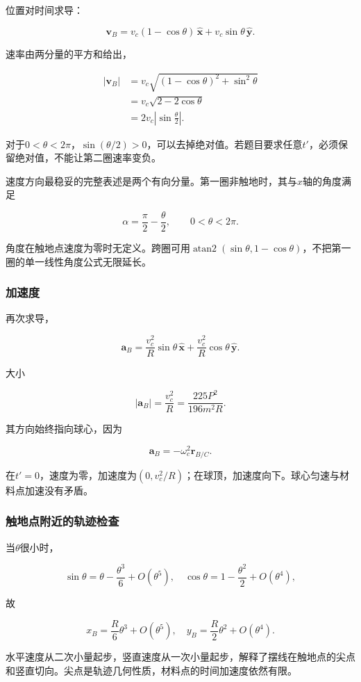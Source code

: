 \documentclass[12pt,a4paper,fontset=fandol]{ctexart}
\begin{document}
位置对时间求导：

\[
\boxed{
\mathbf v_B=
v_c(1-\cos\theta)\,\hat{\mathbf x}
+v_c\sin\theta\,\hat{\mathbf y}}.
\]

速率由两分量的平方和给出，

\[
\begin{aligned}
|\mathbf v_B|
&=v_c\sqrt{(1-\cos\theta)^2+\sin^2\theta}\\
&=v_c\sqrt{2-2\cos\theta}\\
&=\boxed{2v_c\left|\sin\frac{\theta}{2}\right|}.
\end{aligned}
\]

对于\(0<\theta<2\pi\)，\(\sin(\theta/2)>0\)，可以去掉绝对值。若题目要求任意\(t'\)，必须保留绝对值，不能让第二圈速率变负。

速度方向最稳妥的完整表述是两个有向分量。第一圈非触地时，其与\(x\)轴的角度满足

\[
\alpha=\frac{\pi}{2}-\frac{\theta}{2},
\qquad 0<\theta<2\pi.
\]

角度在触地点速度为零时无定义。跨圈可用\(\operatorname{atan2}(\sin\theta,1-\cos\theta)\)，不把第一圈的单一线性角度公式无限延长。

\par\noindent\begin{minipage}{\linewidth}
\subsubsection{加速度}\label{ux52a0ux901fux5ea6}

再次求导，

\[
\boxed{
\mathbf a_B=
\frac{v_c^2}{R}\sin\theta\,\hat{\mathbf x}
+\frac{v_c^2}{R}\cos\theta\,\hat{\mathbf y}}.
\]

大小

\[
\boxed{
|\mathbf a_B|=\frac{v_c^2}{R}
=\frac{225P^2}{196m^2R}}.
\]

其方向始终指向球心，因为

\[
\mathbf a_B=-\omega_c^2\mathbf r_{B/C}.
\]

在\(t'=0\)，速度为零，加速度为\((0,v_c^2/R)\)；在球顶，加速度向下。球心匀速与材料点加速没有矛盾。

\subsubsection{触地点附近的轨迹检查}\label{ux89e6ux5730ux70b9ux9644ux8fd1ux7684ux8f68ux8ff9ux68c0ux67e5}

当\(\theta\)很小时，

\[
\sin\theta=\theta-\frac{\theta^3}{6}+O(\theta^5),
\quad
\cos\theta=1-\frac{\theta^2}{2}+O(\theta^4),
\]

故

\[
x_B=\frac R6\theta^3+O(\theta^5),
\quad
y_B=\frac R2\theta^2+O(\theta^4).
\]

水平速度从二次小量起步，竖直速度从一次小量起步，解释了摆线在触地点的尖点和竖直切向。尖点是轨迹几何性质，材料点的时间加速度依然有限。

\end{minipage}\par
\end{document}
